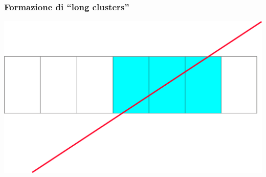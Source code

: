 \documentclass{beamer}
\begin{document}
\begin{frame}
\frametitle{Formazione di ``long clusters''}
\includegraphics[width=\textwidth]{long_cluster}
\end{frame}
\end{document}

